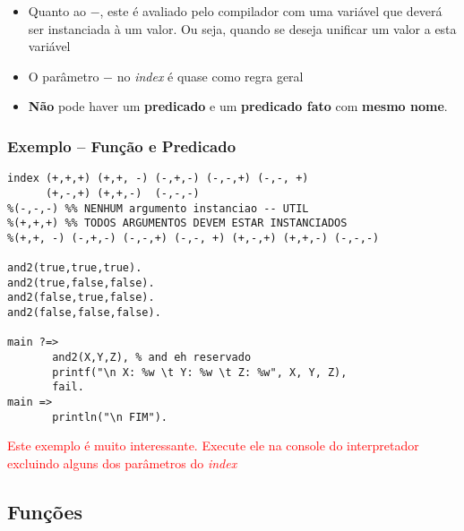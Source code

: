 \begin{frame}[c,allowframebreaks=0.6,fragile]
\begin{itemize}
        \item Quanto ao $-$, este é avaliado pelo compilador com uma variável que deverá ser 
        instanciada à um valor. Ou seja, quando se deseja unificar um valor a esta variável
        
        \item O parâmetro $-$ no \textit{index} é quase como regra geral
        
        
        \item \textbf{Não} pode haver um \textbf{predicado} e um \textbf{predicado 
        fato} com \textbf{mesmo nome}.
        
    \end{itemize}
\end{frame}



\begin{frame} [fragile]
\frametitle{Exemplo -- Função e Predicado}

\begin{small}
\begin{verbatim}
index (+,+,+) (+,+, -) (-,+,-) (-,-,+) (-,-, +) 
      (+,-,+) (+,+,-)  (-,-,-)
%(-,-,-) %% NENHUM argumento instanciao -- UTIL
%(+,+,+) %% TODOS ARGUMENTOS DEVEM ESTAR INSTANCIADOS
%(+,+, -) (-,+,-) (-,-,+) (-,-, +) (+,-,+) (+,+,-) (-,-,-)

and2(true,true,true).
and2(true,false,false).
and2(false,true,false).
and2(false,false,false).

main ?=>
       and2(X,Y,Z), % and eh reservado
       printf("\n X: %w \t Y: %w \t Z: %w", X, Y, Z),
       fail.
main =>       
       println("\n FIM"). 
\end{verbatim}
\end{small}

\textcolor{red}{Este exemplo é muito interessante. Execute ele na console do interpretador
excluindo alguns dos parâmetros do \textit{index}}

\end{frame}




\subsection{Funções}

